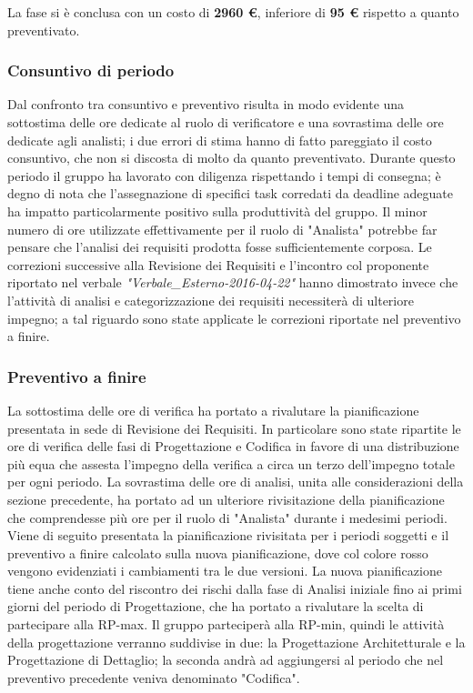 \documentclass[a4paper,11pt]{article}
\begin{document}
	La fase si è conclusa con un costo di \textbf{2960 \euro}, inferiore di \textbf{95 \euro} rispetto a quanto preventivato.
	
	\subsubsection{Consuntivo di periodo}
	Dal confronto tra consuntivo e preventivo risulta in modo evidente una sottostima delle ore dedicate al ruolo di verificatore e una sovrastima delle ore dedicate agli analisti; i due errori di stima hanno di fatto pareggiato il costo consuntivo, che non si discosta di molto da quanto preventivato. Durante questo periodo il gruppo ha lavorato con diligenza rispettando i tempi di consegna; è degno di nota che l'assegnazione di specifici task corredati da deadline adeguate ha impatto particolarmente positivo sulla produttività del gruppo. \newline
	Il minor numero di ore utilizzate effettivamente per il ruolo di "Analista" potrebbe far pensare che l'analisi dei requisiti prodotta fosse sufficientemente corposa. Le correzioni successive alla Revisione dei Requisiti e l'incontro col proponente riportato nel verbale \emph{"Verbale\_Esterno-2016-04-22"} hanno dimostrato invece che l'attività di analisi e categorizzazione dei requisiti necessiterà di ulteriore impegno; a tal riguardo sono state applicate le correzioni riportate nel preventivo a finire.
	\subsubsection{Preventivo a finire}
	\label{Preventivo a finire}
	La sottostima delle ore di verifica ha portato a rivalutare la pianificazione presentata in sede di Revisione dei Requisiti. In particolare sono state ripartite le ore di verifica delle fasi di Progettazione e Codifica in favore di una distribuzione più equa che assesta l'impegno della verifica a circa un terzo dell'impegno totale per ogni periodo. La sovrastima delle ore di analisi, unita alle considerazioni della sezione precedente, ha portato ad un ulteriore rivisitazione della pianificazione che comprendesse più ore per il ruolo di "Analista" durante i medesimi periodi.
	Viene di seguito presentata la pianificazione rivisitata per i periodi soggetti e il preventivo a finire calcolato sulla nuova pianificazione, dove col colore rosso vengono evidenziati i cambiamenti tra le due versioni. La nuova pianificazione tiene anche conto del riscontro dei rischi dalla fase di Analisi iniziale fino ai primi giorni del periodo di Progettazione, che ha portato a rivalutare la scelta di partecipare alla RP-max. Il gruppo parteciperà alla RP-min, quindi le attività della progettazione verranno suddivise in due: la Progettazione Architetturale e la Progettazione di Dettaglio; la seconda andrà ad aggiungersi al periodo che nel preventivo precedente veniva denominato "Codifica".
	
\end{document}
